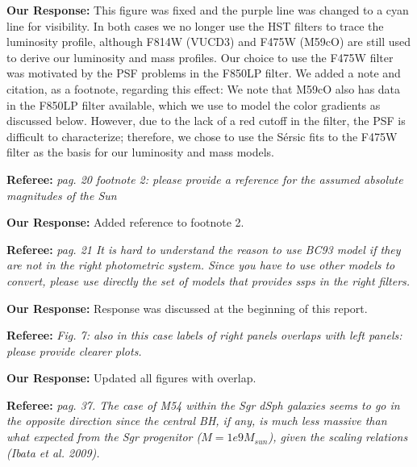 \documentclass[11pt]{article}
\begin{document}
\vspace{0.2cm}
{\bf Our Response:} This figure was fixed and the purple line was changed to a cyan line for visibility. In both cases we no longer use the HST filters to trace the luminosity profile, although F814W (VUCD3) and F475W (M59cO) are still used to derive our luminosity and mass profiles. Our choice to use the F475W filter was motivated by the PSF problems in the F850LP filter. We added a note and citation, as a footnote, regarding this effect: We note that M59cO also has data in the F850LP filter available, which we use to model the color gradients as discussed below. However, due to the lack of a red cutoff in the filter, the PSF is difficult to characterize; therefore, we chose to use the S\'ersic fits to the F475W filter as the basis for our luminosity and mass models.

\vspace{0.5cm}

{\bf Referee:}  {\it pag. 20 footnote 2: please provide a reference for the assumed absolute magnitudes of the Sun}

\vspace{0.2cm}
{\bf Our Response:} Added reference to footnote 2. 

\vspace{0.5cm}

{\bf Referee:}  {\it pag. 21 It is hard to understand the reason to use BC93 model if they are not in the right photometric system. Since you have to use other models to convert, please use directly the set of models that provides ssps in the right filters.}

\vspace{0.2cm}
{\bf Our Response:} Response was discussed at the beginning of this report. 

\vspace{0.5cm}

{\bf Referee:}  {\it Fig. 7: also in this case labels of right panels overlaps with left panels: please provide clearer plots.}

\vspace{0.2cm}
{\bf Our Response:} Updated all figures with overlap.  

\vspace{0.5cm}

{\bf Referee:}  {\it pag. 37. The case of M54 within the Sgr dSph galaxies seems to go in the opposite direction since the central BH, if any, is much less massive than what expected from the Sgr progenitor ($M=1e9 M_{sun}$), given the scaling relations (Ibata et al. 2009).}
\end{document}
